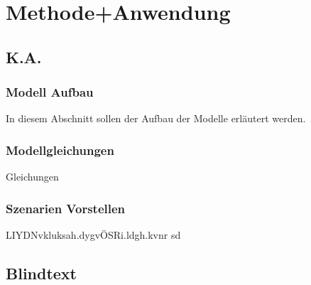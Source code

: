 \chapter{Methode+Anwendung}
\label{cha:Methode+Anwendung}

\section{K.A.}
\label{sec:Sektion 1}

\subsection{Modell Aufbau}
\label{subsec:Abschnitt1}
In diesem Abschnitt sollen der Aufbau der Modelle erläutert werden.
\subsection{Modellgleichungen}
 Gleichungen 

\subsection{Szenarien Vorstellen}
LIYDNvkluksah.dygvÖSRi.ldgh.kvnr sd



\section{Blindtext}


\Blindtext %
